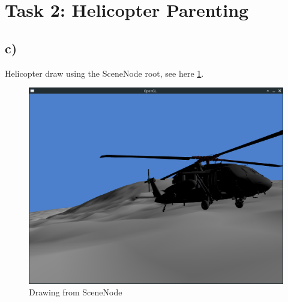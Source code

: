 \section{Task 2: Helicopter Parenting}
\subsection{c)}
Helicopter draw using the SceneNode root, see here \cref{fig:task2c}.

\begin{figure}[tp]
	\centering
	\includegraphics[width=1.00\textwidth]{figures/task2c}
	\caption{Drawing from SceneNode}
\label{fig:task2c}
\end{figure}
